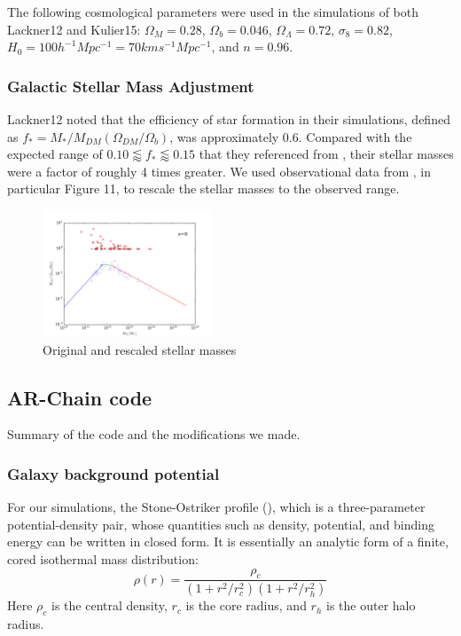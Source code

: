 \documentclass[english, apj]{emulateapj}
\begin{document}
The following cosmological parameters were used in the simulations of both Lackner12 and Kulier15:   $\Omega_M = 0.28$, $\Omega_b = 0.046$, $\Omega_\Lambda = 0.72$, $\sigma_8 = 0.82$, $H_0 = 100h^{-1}Mpc^{-1} = 70 km s^{-1} Mpc^{-1}$, and $n = 0.96$.

\subsubsection{Galactic Stellar Mass Adjustment}
Lackner12 noted that the efficiency of star formation in their simulations, defined as $f_*=M_*/M_{DM}(\Omega_{DM}/\Omega_b)$, was approximately 0.6.  Compared with the expected range of $0.10 \lessapprox f_* \lessapprox 0.15$ that they referenced from \citet{2012ApJ...746...95L}, their stellar masses were a factor of roughly 4 times greater.  We used observational data from \citet{2018AstL...44....8K}, in particular Figure 11, to rescale the stellar masses to the observed range.
\begin{figure}[h!]
\begin{center}
\includegraphics[width=0.45\textwidth]{plots/stellar_to_halo_ratio.png}
\caption{Original and rescaled stellar masses}
\label{fig:stellar1}
\end{center}
\end{figure}

\subsection{AR-Chain code}
Summary of the code and the modifications we made.

\subsubsection{Galaxy background potential}
For our simulations, the Stone-Ostriker profile (\citet{2015ApJ...806L..28S}), which is a three-parameter potential-density pair, whose quantities such as density, potential, and binding energy can be written in closed form.  It is essentially an analytic form of a finite, cored isothermal mass distribution:
\begin{equation} \label{jerry}
\rho(r) = \frac{\rho_c}{(1+r^2/r_{c}^2)(1+r^2/r_{h}^2)}
\end{equation}
Here $\rho_c$ is the central density, $r_c$ is the core radius, and $r_h$ is the outer halo radius.
\end{document}
